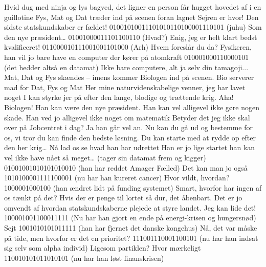 \documentclass[a4paper,11pt]{article}
\begin{document}
\begin{sketch}

\scene Hvid dug med ninja og lys bagved, det ligner en person får hugget hovedet af i en guillotine
\scene Fys, Mat og Dat træder ind på scenen foran lagnet
 Sejren er hvor! Den sidste statskundskaber er fældet!
 01001010011101010110100001110101 (juhu)
 Som den nye præsident\ldots
{} 01001000011101100110 (Hvad?)
 Enig, jeg er helt klart bedst kvalificeret!
 011000010111001001101000 (Arh)
 Hvem foreslår du da? Fysikeren, han vil jo bare have en computer der kører på atomkraft
 010001000110000101 (det hedder altså en datamat)
 Ikke bare computere, alt ja selv din tamagoji...  
\scene Mat, Dat og Fys skændes -- imens kommer Biologen ind på scenen. Bio serverer mad for Dat, Fys og Mat
 Her mine naturvidenskabelige venner, jeg har lavet noget I kan styrke jer på efter den lange, blodige og trættende krig.
 Aha! Biologen! Han kan være den nye præsident. Han kan vel alligevel ikke gøre nogen skade. Han ved jo alligevel ikke noget om matematik
 Betyder det jeg ikke skal over på Jobcentret i dag?
 Ja  han går vel an. Nu kan du gå ud og bestemme for os, vi tror du kan finde den bedste løsning.
 Du kan starte med at rydde op efter den her krig\ldots
{}
 Nå lad os se hvad han har udrettet
 Han er jo lige startet han kan vel ikke have nået så meget\ldots
{} (tager sin datamat frem og kigger) 01001001010101010010 (han har reddet Amager Fælled)
 Det kan man jo også
 1010100001111100001 (nu har han kureret cancer)
 Hvor vildt, hvordan?
 1000001000100 (han ændret lidt på funding systemet)
 Smart, hvorfor har ingen af os tænkt på det? Hvis der er penge til lortet så dur, det åbenbart. Det er jo omvendt af hvordan statskundskaberne plejede at styre landet. Jeg kan lide det!
 100001001100011111 (Nu har han gjort en ende på energi-krisen og hungersnød)
 Sejt
 1001010101011111 (han har fjernet det danske kongehus)
 Nå, det var måske på tide, men hvorfor er det en prioritet?
 111001110001100101 (nu har han indsat sig selv som alpha individ)
 Ligesom partiklen? Hvor mærkeligt
 110010101011010101 (nu har han løst finanskrisen)

\end{sketch}
\end{document}
